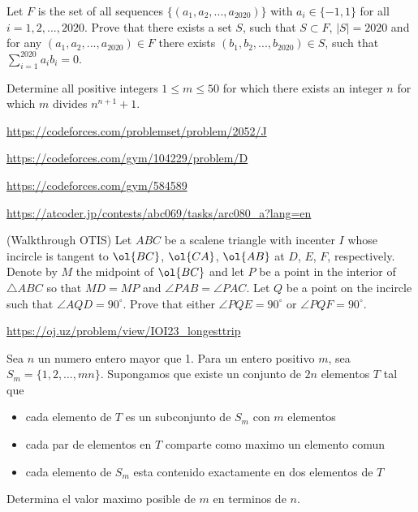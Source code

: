 \documentclass[11pt]{scrartcl}
\begin{document}
\begin{problem}
Let $F$ is the set of all sequences $\{(a_1, a_2, . . . , a_{2020})\}$ with $a_i \in \{-1, 1\}$ for all $i = 1,2,...,2020$. Prove that there exists a set $S$, such that $S \subset F$, $|S| = 2020$ and for any $(a_1,a_2,...,a_{2020}) \in F$ there exists $(b_1,b_2,...,b_{2020}) \in S$, such that $\sum_{i=1}^{2020} a_ib_i = 0$.
\end{problem}
\begin{problem}
Determine all positive integers $1 \le m \le 50$ for which there exists an integer $n$ for which $m$ divides $n^{n+1}+1$.
\end{problem}
\begin{problem}[CF 2052J]
\url{https://codeforces.com/problemset/problem/2052/J}
\end{problem}
\begin{problem}
\url{https://codeforces.com/gym/104229/problem/D} 
\end{problem}
\begin{problem}
\url{https://codeforces.com/gym/584589} 
\end{problem}
\begin{problem}[AC ARC80A]
\url{https://atcoder.jp/contests/abc069/tasks/arc080_a?lang=en}
\end{problem}
\begin{problem}
  (Walkthrough OTIS)
  Let $ABC$ be a scalene triangle with incenter $I$ whose incircle is
  tangent to $\ol{BC}$, $\ol{CA}$, $\ol{AB}$ at $D$, $E$, $F$,
  respectively.  Denote by $M$ the midpoint of $\ol{BC}$ and
  let $P$ be a point in the interior of $\triangle ABC$
  so that $MD = MP$ and $\angle PAB = \angle PAC$.
  Let $Q$ be a point on the incircle such that $\angle AQD = 90^{\circ}$.
  Prove that either $\angle PQE = 90^{\circ}$ or $\angle PQF = 90^{\circ}$.
\end{problem}
\begin{problem}
\url{https://oj.uz/problem/view/IOI23_longesttrip}
\end{problem}
\begin{problem}
Sea $n$ un numero entero mayor que 1. Para un entero positivo $m$, sea $S_m=\{ 1,2,\ldots ,mn \}.$ Supongamos que existe un conjunto de $2n$ elementos $T$ tal que 
\begin{itemize}
\item cada elemento de $T$ es un subconjunto de $S_m$ con $m$ elementos
\item cada par de elementos en $T$ comparte como maximo un elemento comun
\item cada elemento de $S_m$ esta contenido exactamente en dos elementos de $T$
\end{itemize}
Determina el valor maximo posible de $m$ en terminos de $n$.
\end{problem}
\end{document}
